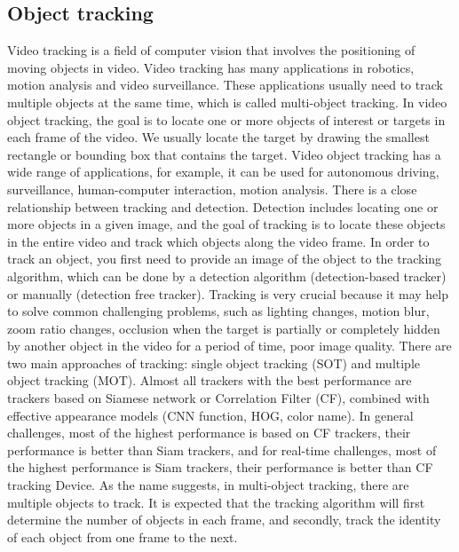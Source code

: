 \subsection{Object tracking}
Video tracking is a field of computer vision that involves the positioning of moving objects in video. Video tracking has many applications in robotics, motion analysis and video surveillance. These applications usually need to track multiple objects at the same time, which is called multi-object tracking. In video object tracking, the goal is to locate one or more objects of interest or targets in each frame of the video. We usually locate the target by drawing the smallest rectangle or bounding box that contains the target. Video object tracking has a wide range of applications, for example, it can be used for autonomous driving, surveillance, human-computer interaction, motion analysis. There is a close relationship between tracking and detection. Detection includes locating one or more objects in a given image, and the goal of tracking is to locate these objects in the entire video and track which objects along the video frame. In order to track an object, you first need to provide an image of the object to the tracking algorithm, which can be done by a detection algorithm (detection-based tracker) or manually (detection free tracker). Tracking is very crucial because it may help to solve common challenging problems, such as lighting changes, motion blur, zoom ratio changes, occlusion when the target is partially or completely hidden by another object in the video for a period of time, poor image quality. There are two main approaches of tracking: single object tracking (SOT) and multiple object tracking (MOT). Almost all trackers with the best performance are trackers based on Siamese network or Correlation Filter (CF), combined with effective appearance models (CNN function, HOG, color name). In general challenges, most of the highest performance is based on CF trackers, their performance is better than Siam trackers, and for real-time challenges, most of the highest performance is Siam trackers, their performance is better than CF tracking Device. As the name suggests, in multi-object tracking, there are multiple objects to track. It is expected that the tracking algorithm will first determine the number of objects in each frame, and secondly, track the identity of each object from one frame to the next.
